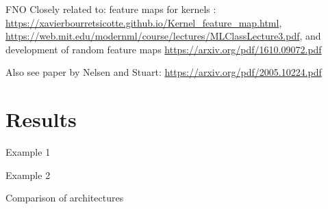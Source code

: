 \documentclass[usenames,dvipsnames]{beamer}
\theoremstyle{definition}
\begin{document}
\begin{frame}{FNO}
    Closely related to: feature maps for kernels : \url{https://xavierbourretsicotte.github.io/Kernel_feature_map.html}, \url{https://web.mit.edu/modernml/course/lectures/MLClassLecture3.pdf}, and development of random feature maps \url{https://arxiv.org/pdf/1610.09072.pdf}

    Also see paper by Nelsen and Stuart: \url{https://arxiv.org/pdf/2005.10224.pdf}
\end{frame}

\section{Results}
\begin{frame}{Example 1}
    
\end{frame}

\begin{frame}{Example 2}
    
\end{frame}

\begin{frame}{Comparison of architectures}
    
\end{frame}
\end{document}
